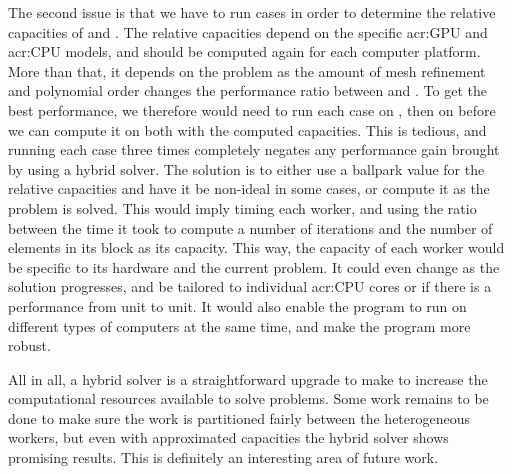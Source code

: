 The second issue is that we have to run cases in order to determine the relative capacities of
 and . The relative capacities depend on the specific
\acrshort{acr:GPU} and \acrshort{acr:CPU} models, and should be computed again for each computer
platform. More than that, it depends on the problem as the amount of mesh refinement and
polynomial order changes the performance ratio between  and
. To get the best performance, we therefore would need to run each case on
, then on  before we can compute it on both with the
computed capacities. This is tedious, and running each case three times completely negates any
performance gain brought by using a hybrid solver. The solution is to either use a ballpark value
for the relative capacities and have it be non-ideal in some cases, or compute it as the problem is
solved. This would imply timing each worker, and using the ratio between the time it took to compute
a number of iterations and the number of elements in its block  as its capacity. This way, the
capacity of each worker would be specific to its hardware and the current problem. It could even
change as the solution progresses, and be tailored to individual \acrshort{acr:CPU} cores or
 if there is a performance from unit to unit. It would also enable the program
to run on different types of computers at the same time, and make the program more robust.

All in all, a hybrid solver is a straightforward upgrade to make to increase the computational
resources available to solve problems. Some work remains to be done to make sure the work is
partitioned fairly between the heterogeneous workers, but even with approximated capacities the
hybrid solver shows promising results. This is definitely an interesting area of future work. 
